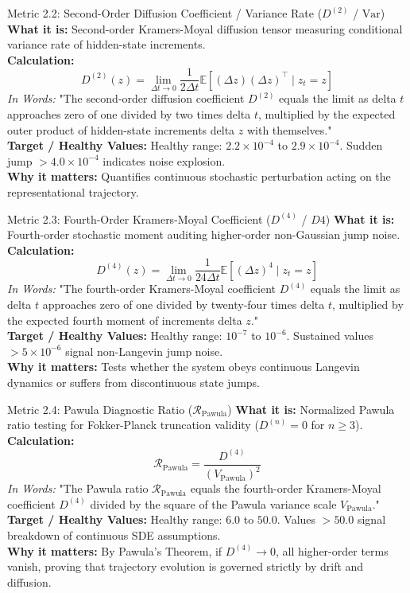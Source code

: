 \documentclass[10pt,a4paper]{article}
\begin{document}
\begin{metricbox}{Metric 2.2: Second-Order Diffusion Coefficient / Variance Rate ($D^{(2)}$ / $\text{Var}$)}
\textbf{What it is:} Second-order Kramers-Moyal diffusion tensor measuring conditional variance rate of hidden-state increments.\\
\textbf{Calculation:}
$$D^{(2)}(z) = \lim_{\Delta t \to 0} \frac{1}{2\Delta t} \mathbb{E}\left[(\Delta z)(\Delta z)^\top \mid z_t = z\right]$$
\emph{In Words:} "The second-order diffusion coefficient $D^{(2)}$ equals the limit as delta $t$ approaches zero of one divided by two times delta $t$, multiplied by the expected outer product of hidden-state increments delta $z$ with themselves."\\
\textbf{Target / Healthy Values:} Healthy range: $2.2 \times 10^{-4}$ to $2.9 \times 10^{-4}$. Sudden jump $> 4.0 \times 10^{-4}$ indicates noise explosion.\\
\textbf{Why it matters:} Quantifies continuous stochastic perturbation acting on the representational trajectory.
\end{metricbox}

\begin{metricbox}{Metric 2.3: Fourth-Order Kramers-Moyal Coefficient ($D^{(4)}$ / $D4$)}
\textbf{What it is:} Fourth-order stochastic moment auditing higher-order non-Gaussian jump noise.\\
\textbf{Calculation:}
$$D^{(4)}(z) = \lim_{\Delta t \to 0} \frac{1}{24 \Delta t} \mathbb{E}\left[(\Delta z)^4 \mid z_t = z\right]$$
\emph{In Words:} "The fourth-order Kramers-Moyal coefficient $D^{(4)}$ equals the limit as delta $t$ approaches zero of one divided by twenty-four times delta $t$, multiplied by the expected fourth moment of increments delta $z$."\\
\textbf{Target / Healthy Values:} Healthy range: $10^{-7}$ to $10^{-6}$. Sustained values $> 5 \times 10^{-6}$ signal non-Langevin jump noise.\\
\textbf{Why it matters:} Tests whether the system obeys continuous Langevin dynamics or suffers from discontinuous state jumps.
\end{metricbox}

\begin{metricbox}{Metric 2.4: Pawula Diagnostic Ratio ($\mathcal{R}_{\text{Pawula}}$)}
\textbf{What it is:} Normalized Pawula ratio testing for Fokker-Planck truncation validity ($D^{(n)} = 0$ for $n \ge 3$).\\
\textbf{Calculation:}
$$\mathcal{R}_{\text{Pawula}} = \frac{D^{(4)}}{(V_{\text{Pawula}})^2}$$
\emph{In Words:} "The Pawula ratio $\mathcal{R}_{\text{Pawula}}$ equals the fourth-order Kramers-Moyal coefficient $D^{(4)}$ divided by the square of the Pawula variance scale $V_{\text{Pawula}}$."\\
\textbf{Target / Healthy Values:} Healthy range: $6.0$ to $50.0$. Values $> 50.0$ signal breakdown of continuous SDE assumptions.\\
\textbf{Why it matters:} By Pawula's Theorem, if $D^{(4)} \to 0$, all higher-order terms vanish, proving that trajectory evolution is governed strictly by drift and diffusion.
\end{metricbox}
\end{document}
